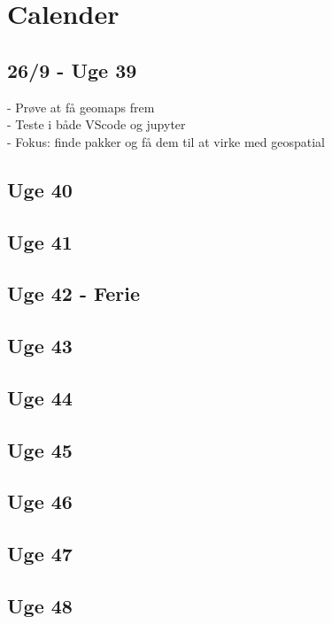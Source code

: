 \documentclass{article}
\begin{document}
\section*{Calender}
\subsection*{26/9 - Uge 39}
- Prøve at få geomaps frem\\
- Teste i både VScode og jupyter\\
- Fokus: finde pakker og få dem til at virke med geospatial\\
\subsection*{Uge 40}
\subsection*{Uge 41}
\subsection*{Uge 42 - Ferie}
\subsection*{Uge 43}
\subsection*{Uge 44}
\subsection*{Uge 45}
\subsection*{Uge 46}
\subsection*{Uge 47}
\subsection*{Uge 48}
\end{document}
